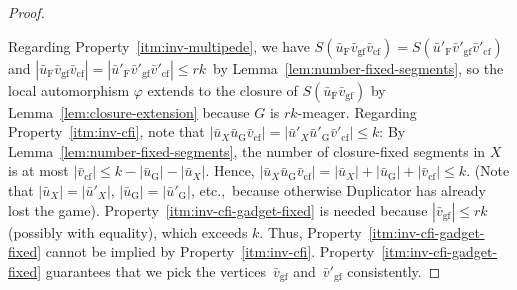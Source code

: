 \documentclass[]{lmcs}
\renewcommand{\phi}{\varphi}
\newcommand{\auto}{\phi}
\newcommand{\tup}[1]{\bar{#1}}
\newcommand{\vertA}{u}
\newcommand{\vertB}{v}
\newcommand{\tlength}[1]{| #1 |}
\newcommand{\footbset}{X}
\newcommand{\footbsetA}{X}
\newcommand{\segmentOf}[1]{S(#1)}
\newcommand{\feetrestrict}[2]{#1_{#2}}
\newcommand{\gadgetrestrict}[1]{#1_{\text{G}}}
\newcommand{\nongadgetrestrict}[1]{#1_{\text{F}}}
\newcommand{\gadgetfixed}[1]{#1_{\text{gf}}}
\newcommand{\closurefixed}[1]{#1_{\text{cf}}}
\begin{document}
\begin{proof}
\begin{enumerate}
	\end{enumerate}
	Regarding Property~\ref{itm:inv-multipede}, we have
	${\segmentOf{\nongadgetrestrict{\tup{\vertA}}\gadgetfixed{\tup{\vertB}}\closurefixed{\tup{\vertB}}} = \segmentOf{\nongadgetrestrict{\tup{\vertA}'}\gadgetfixed{\tup{\vertB}'}\closurefixed{\tup{\vertB}'}}}$ and
	${\tlength{\nongadgetrestrict{\tup{\vertA}}\gadgetfixed{\tup{\vertB}}\closurefixed{\tup{\vertB}}}=\tlength{\nongadgetrestrict{\tup{\vertA}'}\gadgetfixed{\tup{\vertB}'}\closurefixed{\tup{\vertB}'}} \leq rk}$~by Lemma~\ref{lem:number-fixed-segments},
	so the local automorphism $\auto$ extends to the closure of $\segmentOf{\nongadgetrestrict{\tup{\vertA}}\gadgetfixed{\tup{\vertB}}}$
	by Lemma~\ref{lem:closure-extension}
	because $G$ is $rk$-meager.
	Regarding Property~\ref{itm:inv-cfi}, note that ${\tlength{\feetrestrict{\tup{\vertA}}{\footbsetA}\gadgetrestrict{\tup{\vertA}}\closurefixed{\tup{\vertB}}} = \tlength{\feetrestrict{\tup{\vertA}'}{\footbsetA}\gadgetrestrict{\tup{\vertA}'}\closurefixed{\tup{\vertB}'}} \leq k}$:
	By Lemma~\ref{lem:number-fixed-segments},
	the number of closure-fixed segments in $\footbset$ is at most
	${\tlength{\closurefixed{\tup{\vertB}}} \leq k - \tlength{\gadgetrestrict{\tup{\vertA}}} - \tlength{\feetrestrict{\tup{\vertA}}{\footbset}}}$.
	Hence, ${\tlength{\feetrestrict{\tup{\vertA}}{\footbsetA}\gadgetrestrict{\tup{\vertA}}\closurefixed{\tup{\vertB}}}
	= \tlength{\feetrestrict{\tup{\vertA}}{\footbsetA}} +\tlength{\gadgetrestrict{\tup{\vertA}}}
	+\tlength{\closurefixed{\tup{\vertB}}} \leq k}$.
	(Note that ${\tlength{\feetrestrict{\tup{\vertA}}{\footbsetA}}=\tlength{\feetrestrict{\tup{\vertA}'
		}{\footbsetA}}}$, ${\tlength{\gadgetrestrict{\tup{\vertA}}} = \tlength{\gadgetrestrict{\tup{\vertA}'}}}$, etc.,~because otherwise Duplicator has already lost the game).
	Property~\ref{itm:inv-cfi-gadget-fixed} is needed because 
	$\tlength{\gadgetfixed{\tup{\vertB}}} \leq r k$ (possibly with equality), which exceeds $k$.
	Thus, Property~\ref{itm:inv-cfi-gadget-fixed} cannot be implied by Property~\ref{itm:inv-cfi}.
	Property~\ref{itm:inv-cfi-gadget-fixed} guarantees that we pick
	the vertices~$\gadgetfixed{\tup{\vertB}}$ and~$\gadgetfixed{\tup{\vertB}'}$ consistently.
	

\end{proof}
\end{document}

